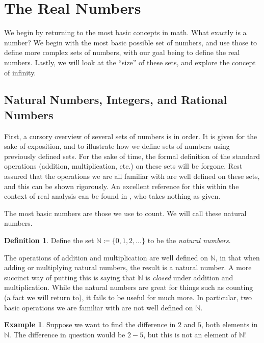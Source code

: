 \documentclass{article}
\newcommand{\N}{\mathbb{N}}
\theoremstyle{definition}
\newtheorem{definition}{Definition}[section]
\newtheorem{example}{Example}[section]
\begin{document}
\section{The Real Numbers}
We begin by returning to the most basic concepts in math. What exactly is a number? We begin with the most basic possible set of numbers, and use those to define more complex sets of numbers, with our goal being to define the real numbers. Lastly, we will look at the ``size'' of these sets, and explore the concept of infinity. 
\subsection{Natural Numbers, Integers, and Rational Numbers}
First, a cursory overview of several sets of numbers is in order. It is given for the sake of exposition, and to illustrate how we define sets of numbers using previously defined sets. For the sake of time, the formal definition of the standard operations (addition, multiplication, etc.) on these sets will be forgone. Rest assured that the operations we are all familiar with are well defined on these sets, and this can be shown rigorously. An excellent reference for this within the context of real analysis can be found in \cite{tao2006analysis}, who takes nothing as given. 

 The most basic numbers are those we use to count. We will call these natural numbers. \begin{definition}
Define the set $ \N\coloneqq\{0,1,2,\ldots\} $ to be the \textit{{\color{red} natural numbers}}. 
\end{definition}
\noindent The operations of addition and multiplication are well defined on $ \N $, in that when adding or multiplying natural numbers, the result is a natural number. A more succinct way of putting this is saying that $ \N $ is \textit{closed} under addition and multiplication. While the natural numbers are great for things such as counting (a fact we will return to), it fails to be useful for much more. In particular, two basic operations we are familiar with are not well defined on $ \N $.
\begin{example}
	Suppose we want to find the difference in $ 2 $ and $ 5 $, both elements in $ \N $. The difference in question would be $ 2-5 $, but this is not an element of $ \N $! 
\end{example}
\end{document}
